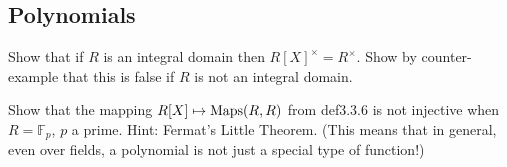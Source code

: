 \subsection{Polynomials}
\item Show that if $R$ is an integral domain then $R[X]^{\times} = R^{\times}$. Show by counter-example that this is false if $R$ is not an integral domain.
\item Show that the mapping $R[X] \mapsto \text{Maps}(R, R)$ from def3.3.6 is not injective when $R = \mathbb{F}_{p}$, $p$ a prime. Hint: Fermat's Little Theorem. (This means that in general, even over fields, a polynomial is not just a special type of function!)